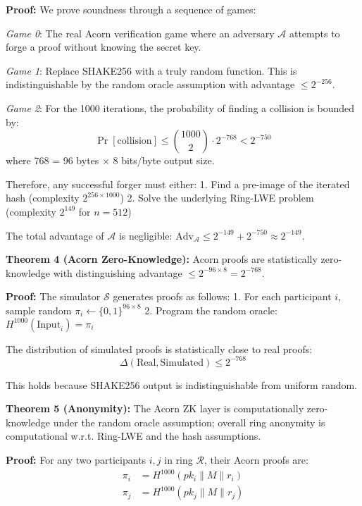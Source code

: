 \documentclass[11pt,a4paper]{article}
\begin{document}
\textbf{Proof:} We prove soundness through a sequence of games:

\textit{Game 0}: The real Acorn verification game where an adversary $\mathcal{A}$ attempts to forge a proof without knowing the secret key.

\textit{Game 1}: Replace SHAKE256 with a truly random function. This is indistinguishable by the random oracle assumption with advantage $\leq 2^{-256}$.

\textit{Game 2}: For the 1000 iterations, the probability of finding a collision is bounded by:
\begin{equation}
\Pr[\text{collision}] \leq \binom{1000}{2} \cdot 2^{-768} < 2^{-750}
\end{equation}
where 768 = 96 bytes × 8 bits/byte output size.

Therefore, any successful forger must either:
1. Find a pre-image of the iterated hash (complexity $2^{256 \times 1000}$)
2. Solve the underlying Ring-LWE problem (complexity $2^{149}$ for $n=512$)

The total advantage of $\mathcal{A}$ is negligible: $\text{Adv}_{\mathcal{A}} \leq 2^{-149} + 2^{-750} \approx 2^{-149}$.

\textbf{Theorem 4 (Acorn Zero-Knowledge):} Acorn proofs are statistically zero-knowledge with distinguishing advantage $\leq 2^{-96 \times 8} = 2^{-768}$.

\textbf{Proof:} The simulator $\mathcal{S}$ generates proofs as follows:
1. For each participant $i$, sample random $\pi_i \leftarrow \{0,1\}^{96 \times 8}$
2. Program the random oracle: $H^{1000}(\text{Input}_i) = \pi_i$

The distribution of simulated proofs is statistically close to real proofs:
\begin{equation}
\Delta(\text{Real}, \text{Simulated}) \leq 2^{-768}
\end{equation}

This holds because SHAKE256 output is indistinguishable from uniform random.

\textbf{Theorem 5 (Anonymity):} The Acorn ZK layer is computationally zero-knowledge under the random oracle assumption; overall ring anonymity is computational w.r.t. Ring-LWE and the hash assumptions.

\textbf{Proof:} For any two participants $i, j$ in ring $\mathcal{R}$, their Acorn proofs are:
\begin{align}
\pi_i &= H^{1000}(pk_i \| M \| r_i) \\
\pi_j &= H^{1000}(pk_j \| M \| r_j)
\end{align}
\end{document}
